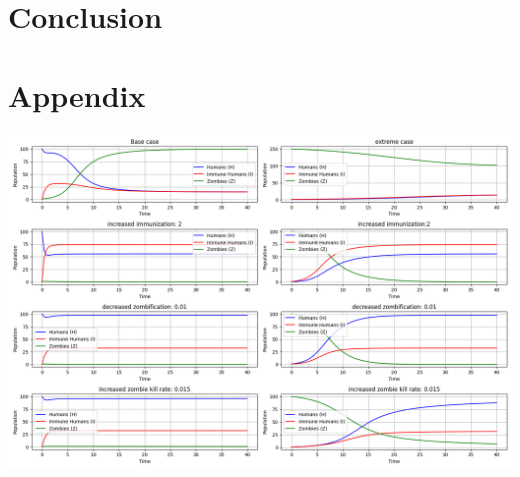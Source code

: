\documentclass[
	12pt
]{article}
\begin{document}
\section{Conclusion}

\section{Appendix}

\includegraphics[width=\textwidth]{comparison of apocalypse 2.png}
\end{document}
